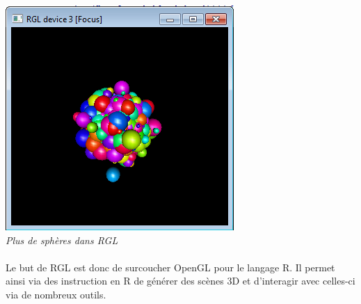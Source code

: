 \begin{center}
\includegraphics[scale=0.7]{screen_rgl3.png}\\
\textit{Plus de sphères dans RGL}
\end{center}


\paragraph{}
Le but de RGL est donc de surcoucher OpenGL pour le langage R. Il permet ainsi via des instruction en R de générer des scènes 3D et d'interagir avec celles-ci via de nombreux outils.
